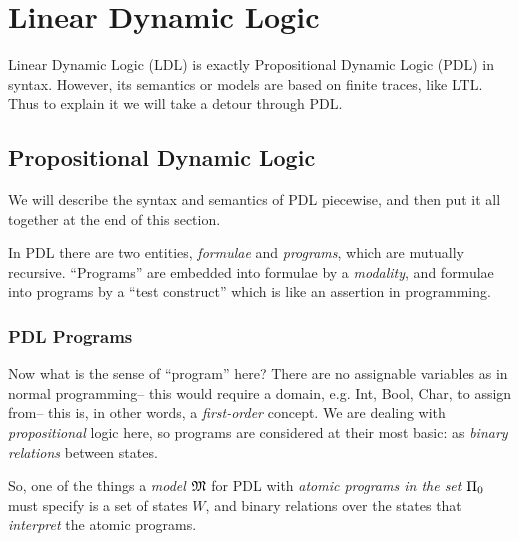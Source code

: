 

\begin{comment}
Note to writer:
Important commands: (math mode)
\di{x} writes x in diamond brackets
\sq{x} '' in square brackets
\prog  symbol for program, currently PI
\vphi  alternate phi symbol (curly)
\model symbol for a PDL/modal logic model
\neg   logical negation symbol
\end{comment}

\section {Linear Dynamic Logic}

Linear Dynamic Logic (LDL) is exactly Propositional Dynamic Logic (PDL)\cite{dynamic-logic} in syntax. However, its semantics or models are based on finite traces, like LTL. Thus to explain it we will take a detour through PDL.


\subsection{Propositional Dynamic Logic}

We will describe the syntax and semantics of PDL piecewise, and then put it all together at the end of this section.

In PDL there are two entities, \emph{formulae} and \emph{programs}, which are mutually recursive. ``Programs'' are embedded into formulae by a \emph{modality}, and formulae into programs by a ``test construct'' which is like an assertion in programming.

\subsubsection{PDL Programs}

Now what is the sense of ``program'' here? There are no assignable variables as in normal programming-- this would require a domain, e.g. Int, Bool, Char, to assign from-- this is, in other words, a \emph{first-order} concept. We are dealing with \emph{propositional} logic here, so programs are considered at their most basic: as \emph{binary relations} between states.
\begin{comment}
In functional programming, programs are thought of as functions; this more general view allows for nondeterminism and partial functions.
\end{comment}

So, one of the things a \emph{model} $\mathfrak{M}$ for PDL with \textit{atomic programs in the set $\Pi_0$} must specify is a set of states $W$, and binary relations over the states that \textit{interpret} the atomic programs.

